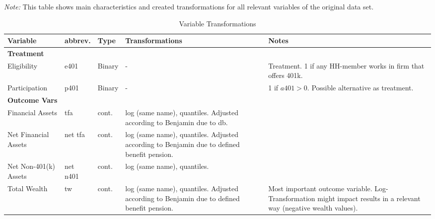\begin{landscape}
\begin{singlespace}
\begin{scriptsize}
			\def\sym#1{\ifmmode^{#1}\else\(^{#1}\)\fi}
			\begin{ThreePartTable}
				\begin{TableNotes}
					\begin{scriptsize}
					\item \textit{Note:} This table shows main characteristics and created transformations for all relevant variables of the original data set.
					\end{scriptsize}
				\end{TableNotes}
				
				\begin{longtable}{l C{2cm} C{2cm} C{7cm} C{7cm} }
					\caption{Variable Transformations}\label{tab_variable_transformation}\\
					\toprule
					\textbf{Variable} & \textbf{abbrev.} & \textbf{Type} & \textbf{Transformations} & \textbf{Notes}   \\
					\midrule
					\textbf{Treatment} & & & & \\
					Eligibility & e401 & Binary & - & Treatment. 1 if any HH-member works in firm that offers 401k. \\
					Participation & p401 & Binary & - & 1 if $a401>0$. Possible alternative as treatment.  \\
					\midrule
					\textbf{Outcome Vars} & & & & \\
					Financial Assets & tfa & cont. & log (same name), quantiles. Adjusted according to Benjamin due to db.  &	\\
					Net Financial Assets & net tfa & cont.&  log (same name), quantiles. Adjusted according to Benjamin due to defined benefit pension.&	\\
					Net Non-401(k) Assets & net n401 & cont.&log (same name), quantiles. & \\
					Total Wealth & tw & cont.&  log (same name), quantiles. Adjusted according to Benjamin due to defined benefit pension. & Most important outcome variable. Log-Transformation might impact results in a relevant way (negative wealth values). \\


\end{longtable}
\end{ThreePartTable}
\end{scriptsize}
\end{singlespace}
\end{landscape}
